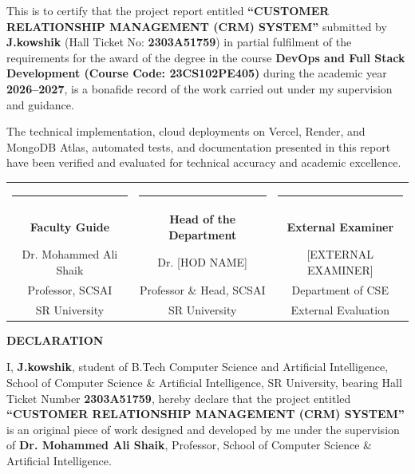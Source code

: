 \noindent This is to certify that the project report entitled \textbf{``CUSTOMER RELATIONSHIP MANAGEMENT (CRM) SYSTEM''} submitted by \textbf{J.kowshik} (Hall Ticket No: \textbf{2303A51759}) in partial fulfilment of the requirements for the award of the degree in the course \textbf{DevOps and Full Stack Development (Course Code: 23CS102PE405)} during the academic year \textbf{2026--2027}, is a bonafide record of the work carried out under my supervision and guidance.

\vspace{0.4cm}
\noindent The technical implementation, cloud deployments on Vercel, Render, and MongoDB Atlas, automated tests, and documentation presented in this report have been verified and evaluated for technical accuracy and academic excellence.

\vspace{2.5cm}
\noindent
\begin{tabular*}{\textwidth}{@{\extracolsep{\fill}}ccc}
    \rule{4.5cm}{0.8pt} & \rule{4.5cm}{0.8pt} & \rule{4.5cm}{0.8pt} \\
    \textbf{Faculty Guide} & \textbf{Head of the Department} & \textbf{External Examiner} \\
    Dr. Mohammed Ali Shaik & Dr. [HOD NAME] & [EXTERNAL EXAMINER] \\
    Professor, SCSAI & Professor \& Head, SCSAI & Department of CSE \\
    SR University & SR University & External Evaluation
\end{tabular*}

\newpage
\thispagestyle{plain}
\begin{center}
    {\fontsize{16}{20}\selectfont \textbf{DECLARATION}}\\[0.6cm]
\end{center}

\noindent I, \textbf{J.kowshik}, student of B.Tech Computer Science and Artificial Intelligence, School of Computer Science \& Artificial Intelligence, SR University, bearing Hall Ticket Number \textbf{2303A51759}, hereby declare that the project entitled \textbf{``CUSTOMER RELATIONSHIP MANAGEMENT (CRM) SYSTEM''} is an original piece of work designed and developed by me under the supervision of \textbf{Dr. Mohammed Ali Shaik}, Professor, School of Computer Science \& Artificial Intelligence.

